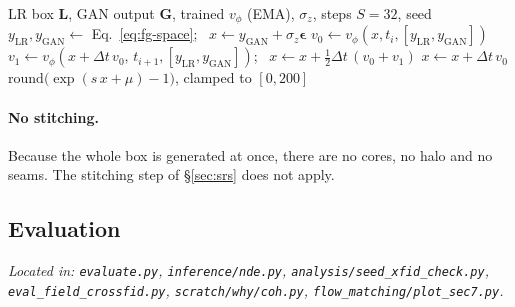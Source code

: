 \begin{algorithm}[H]
\caption{Flow+GAN inference (one box, one draw)}
\label{alg:fg-infer}
\begin{algorithmic}[1]
\Require LR box $\mathbf L$, GAN output $\mathbf G$, trained $v_\phi$ (EMA), $\sigma_z$, steps $S{=}32$, seed
\State $y_\text{LR},y_\text{GAN}\gets$ Eq.~\ref{eq:fg-space}; \ $x\gets y_\text{GAN}+\sigma_z\boldsymbol\epsilon$ 
 
  \State $v_0\gets v_\phi(x,t_i,[y_\text{LR},y_\text{GAN}])$
    \State $v_1\gets v_\phi(x+\Delta t\,v_0,\,t_{i+1},[y_\text{LR},y_\text{GAN}])$; \ $x\gets x+\tfrac12\Delta t\,(v_0+v_1)$ 
  \Else
    \State $x\gets x+\Delta t\,v_0$ 
  \EndIf
\EndFor
\State \Return $\mathrm{round}\big(\exp(s\,x+\mu)-1\big)$, clamped to $[0,200]$ 
\end{algorithmic}
\end{algorithm}

\paragraph{No stitching.} Because the whole box is generated at once, there are
no cores, no halo and no seams. The stitching step of \S\ref{sec:srs} does not
apply.

\subsection{Evaluation}
\label{sec:fg-eval}
\textit{Located in: \texttt{evaluate.py}, \texttt{inference/nde.py},
\texttt{analysis/seed\_xfid\_check.py}, \texttt{eval\_field\_crossfid.py},
\texttt{scratch/why/coh.py}, \texttt{flow\_matching/plot\_sec7.py}.}

